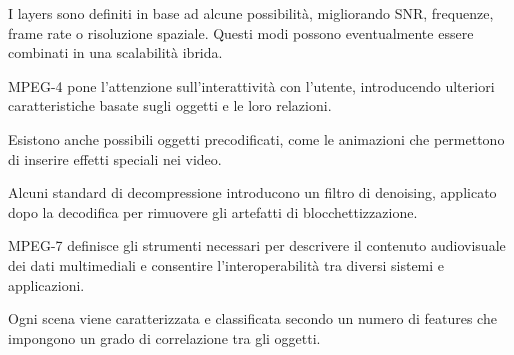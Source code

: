 I layers sono definiti in base ad alcune possibilità, migliorando SNR, frequenze, frame rate o risoluzione spaziale. Questi modi possono eventualmente essere combinati in una scalabilità ibrida. 

MPEG-4 pone l'attenzione sull'interattività con l'utente, introducendo ulteriori caratteristiche basate sugli oggetti e le loro relazioni.

Esistono anche possibili oggetti precodificati, come le animazioni che permettono di inserire effetti speciali nei video.

Alcuni standard di decompressione introducono un filtro di denoising, applicato dopo la decodifica per rimuovere gli artefatti di blocchettizzazione. 

MPEG-7 definisce gli strumenti necessari per descrivere il contenuto audiovisuale dei dati multimediali e consentire l'interoperabilità tra diversi sistemi e applicazioni.

Ogni scena viene caratterizzata e classificata secondo un numero di features che impongono un grado di correlazione tra gli oggetti.



